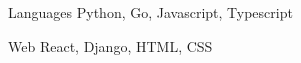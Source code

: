 



\begin{cvskills}


  \cvskill
    {Languages} %
    {Python, Go, Javascript, Typescript} %


  \cvskill
    {Web} %
    {React, Django, HTML, CSS} %


\end{cvskills}

